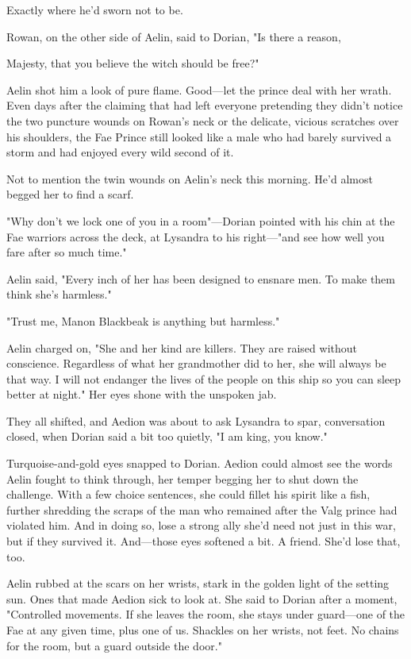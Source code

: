 Exactly where he'd sworn not to be.

Rowan, on the other side of Aelin, said to Dorian, "Is there a reason,

Majesty, that you believe the witch should be free?"

Aelin shot him a look of pure flame.
Good---let the prince deal with her wrath.
Even days after the claiming that had left everyone pretending they didn't notice the two puncture wounds on Rowan's neck or the delicate, vicious scratches over his shoulders, the Fae Prince still looked like a male who had barely survived a storm and had enjoyed every wild second of it.

Not to mention the twin wounds on Aelin's neck this morning.
He'd almost begged her to find a scarf.

"Why don't we lock one of you in a room"---Dorian pointed with his chin at the Fae warriors across the deck, at Lysandra to his right---"and see how well you fare after so much time."

Aelin said, "Every inch of her has been designed to ensnare men.
To make them think she's harmless."

"Trust me, Manon Blackbeak is anything but harmless."

Aelin charged on, "She and her kind are killers.
They are raised without conscience.
Regardless of what her grandmother did to her, she will always be that way.
I will not endanger the lives of the people on this ship so you can sleep better at night."
Her eyes shone with the unspoken jab.

They all shifted, and Aedion was about to ask Lysandra to spar, conversation closed, when Dorian said a bit too quietly, "I am king, you know."

Turquoise-and-gold eyes snapped to Dorian.
Aedion could almost see the words Aelin fought to think through, her temper begging her to shut down the challenge.
With a few choice sentences, she could fillet his spirit like a fish, further shredding the scraps of the man who remained after the Valg prince had violated him.
And in doing so, lose a strong ally she'd need not just in this war, but if they survived it.
And---those eyes softened a bit.
A friend.
She'd lose that, too.

Aelin rubbed at the scars on her wrists, stark in the golden light of the setting sun.
Ones that made Aedion sick to look at.
She said to Dorian after a moment, "Controlled movements.
If she leaves the room, she stays under guard---one of the Fae at any given time, plus one of us.
Shackles on her wrists, not feet.
No chains for the room, but a guard outside the door."

